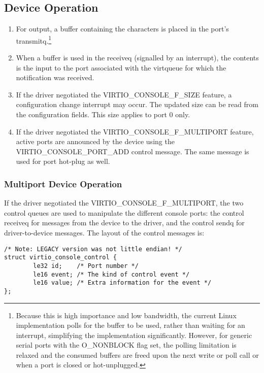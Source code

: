 \subsection{Device Operation}\label{sec:Device Types / Console Device / Device Operation}

\begin{enumerate}
\item For output, a buffer containing the characters is placed in
  the port's transmitq.\footnote{Because this is high importance and low bandwidth, the current
Linux implementation polls for the buffer to be used, rather than
waiting for an interrupt, simplifying the implementation
significantly. However, for generic serial ports with the
O_NONBLOCK flag set, the polling limitation is relaxed and the
consumed buffers are freed upon the next write or poll call or
when a port is closed or hot-unplugged.
}

\item When a buffer is used in the receiveq (signalled by an
  interrupt), the contents is the input to the port associated
  with the virtqueue for which the notification was received.

\item If the driver negotiated the VIRTIO_CONSOLE_F_SIZE feature, a
  configuration change interrupt may occur. The updated size can
  be read from the configuration fields.  This size applies to port 0 only.

\item If the driver negotiated the VIRTIO_CONSOLE_F_MULTIPORT
  feature, active ports are announced by the device using the
  VIRTIO_CONSOLE_PORT_ADD control message. The same message is
  used for port hot-plug as well.
\end{enumerate}

\subsubsection{Multiport Device Operation}\label{sec:Device Types / Console Device / Device Operation / Multiport Device Operation}

If the driver negotiated the VIRTIO_CONSOLE_F_MULTIPORT, the two
control queues are used to manipulate the different console ports: the
control receiveq for messages from the device to the driver, and the
control sendq for driver-to-device messages.  The layout of the
control messages is:

\begin{lstlisting}
/* Note: LEGACY version was not little endian! */
struct virtio_console_control {
        le32 id;    /* Port number */
        le16 event; /* The kind of control event */
        le16 value; /* Extra information for the event */
};
\end{lstlisting}

